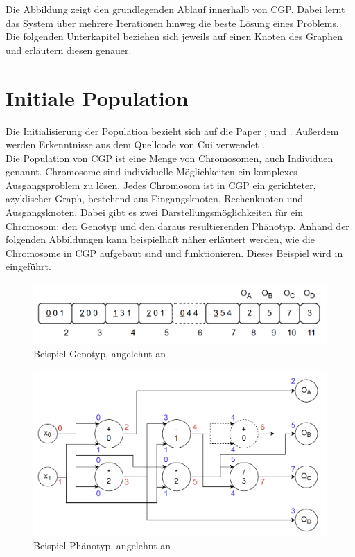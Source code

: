 Die Abbildung zeigt den grundlegenden Ablauf innerhalb von CGP.
Dabei lernt das System über mehrere Iterationen hinweg die beste Lösung eines Problems.
Die folgenden Unterkapitel beziehen sich jeweils auf einen Knoten des Graphen und erläutern diesen genauer.


\section{Initiale Population}
\label{sec:initialePopulation}
Die Initialisierung der Population bezieht sich auf die Paper \cite{miller_cartesian_2020}, \cite{torabi_using_2022} und \cite{milad_taleby_ahvanooey_survey_2019}.
Außerdem werden Erkenntnisse aus dem Quellcode von Cui verwendet \cite{cuihen_cuihencgp_with_crossover_strategies_2024}.\\
Die Population von CGP ist eine Menge von Chromosomen, auch Individuen genannt.
Chromosome sind individuelle Möglichkeiten ein komplexes Ausgangsproblem zu lösen.
Jedes Chromosom ist in CGP ein gerichteter, azyklischer Graph, bestehend aus Eingangsknoten, Rechenknoten und Ausgangsknoten.
Dabei gibt es zwei Darstellungsmöglichkeiten für ein Chromosom: den Genotyp und den daraus resultierenden Phänotyp.
Anhand der folgenden Abbildungen kann beispielhaft näher erläutert werden, wie die Chromosome in CGP aufgebaut sind und funktionieren. Dieses Beispiel wird in \cite{torabi_using_2022} eingeführt.

\begin{figure}[H]
    \centering
    \includegraphics[scale = 0.45]{Bilder/TorabiBeispielGenotypNeu.png}
    \caption{Beispiel Genotyp, angelehnt an \cite{torabi_using_2022}}
    \label{fig:genotypNeu}
\end{figure}
\begin{figure}[H]
    \includegraphics[scale = 0.45]{Bilder/BeispielChromosom.png}
    \caption{Beispiel Phänotyp, angelehnt an \cite{torabi_using_2022}}
    \label{fig:phänotyp}
\end{figure}

